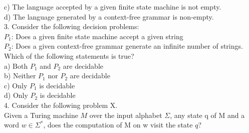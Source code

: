 \documentclass[8pt]{beamer}
\begin{document}
\begin{frame}
\hspace*{0.5cm} c) The language accepted by a given finite state machine is not empty.\\

\vspace*{0.1cm}
\hspace*{0.5cm} d) The language generated by a context-free grammar is non-empty.\\

\vspace*{0.2cm}
\hspace*{-0.4cm}
3. Consider the following decision problems:\\

\vspace*{0.1cm}
\hspace*{0.5cm} $P _{1}$: Does a given finite state machine accept a given string\\

\vspace*{0.1cm}
\hspace*{0.5cm} $P _{2}$: Does a given context-free grammar generate an infinite number of strings.\\

\vspace*{0.1cm}
\hspace*{0.5cm} Which of the following statements is true?\\

\vspace*{0.1cm}
\hspace*{0.5cm} a) Both $P _{1}$ and $P _{2}$ are decidable\\
\hspace*{0.5cm} b) Neither $P _{1}$ nor $P _{2}$ are decidable\\
\hspace*{0.5cm} c) Only $P _{1}$ is decidable\\
\hspace*{0.5cm} d) Only $P _{2}$ is decidable\\

\vspace*{0.2cm}
\hspace*{-0.4cm}
4. Consider the following problem X.\\
\hspace*{0.5cm} Given a Turing machine $M$ over the input alphabet $\Sigma$, any state q of M and a word $w \in \Sigma ^{*}$, does
the computation of M on w visit the state $q$?\\
\end{frame}
\end{document}
